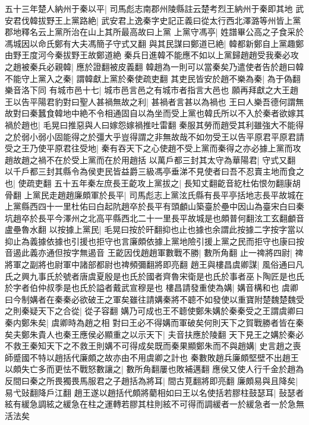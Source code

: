 五十三年楚人納州于秦以平|{
	司馬彪志南郡州陵縣註云楚考烈王納州于秦即其地}
武安君伐韓拔野王上黨路絶|{
	武安君上逸秦字史記正義曰從太行西北澤潞等州皆上黨郡地釋名云上黨所治在山上其所最高故曰上黨}
上黨守馮亭|{
	姓譜畢公高之子食采於馮城因以命氏鄭有大夫馮簡子守式又翻}
與其民謀曰鄭道已絶|{
	韓都新鄭自上黨趣鄭由野王度河今秦拔野王故鄭道絶}
秦兵日進韓不能應不如以上黨歸趙趙受我秦必攻之趙被秦兵必親韓|{
	應於證翻被皮義翻}
韓趙為一則可以當秦矣乃遣使者告於趙曰韓不能守上黨入之秦|{
	謂韓獻上黨於秦使疏吏翻}
其吏民皆安於趙不樂為秦|{
	為于偽翻樂音洛下同}
有城市邑十七|{
	城市邑言邑之有城市者指言大邑也}
願再拜獻之大王趙王以告平陽君豹對曰聖人甚禍無故之利|{
	甚禍者言甚以為禍也}
王曰人樂吾德何謂無故對曰秦蠶食韓地中絶不令相通固自以為坐而受上黨也韓氏所以不入於秦者欲嫁其禍於趙也|{
	毛晃曰推惡與人曰嫁怨嫁禍推吐雷翻}
秦服其勞而趙受其利雖強大不能得之於弱小弱小固能得之於彊大乎豈得謂之非無故哉不如勿受王以告平原君平原君請受之王乃使平原君往受地|{
	秦有吞天下之心使趙不受上黨而秦得之亦必據上黨而攻趙故趙之禍不在於受上黨而在於用趙括}
以萬戶都三封其太守為華陽君|{
	守式又翻}
以千戶都三封其縣令為侯吏民皆益爵三級馮亭垂涕不見使者曰吾不忍賣主地而食之也|{
	使疏吏翻}
五十五年秦左庶長王齕攻上黨拔之|{
	長知丈翻齕音紇杜佑恨勿翻康胡骨翻}
上黨民走趙趙廉頗軍於長平|{
	司馬彪志上黨泫氏縣有長平亭括地志長平故城在上黨縣西四十一里杜佑曰白起阬趙卒於長平有頭顱山築臺於壘中因山為臺宋白曰秦坑趙卒於長平今澤州之北高平縣西北二十一里長平故城是也頗普何翻泫工玄翻顱音盧壘魯水翻}
以按據上黨民|{
	毛晃曰按於旰翻抑也止也據也余謂此按據二字按字當以抑止為義據依據也引援也拒守也言廉頗依據上黨地險引援上黨之民而拒守也康曰按音遏此義亦通但按字無遏音}
王齕因伐趙趙軍數戰不勝|{
	數所角翻}
止一禆將四尉|{
	禆將軍之副將也尉軍中諸部都尉也禆頻彌翻將即亮翻}
趙王與樓昌虞卿謀|{
	風俗通曰凡氏之興九事氏於號者唐虞夏殷是也氏於國者齊魯宋衛是也氏於事者巫卜陶匠是也氏於字者伯仲叔季是也氏於謚者戴武宣穆是也}
樓昌請發重使為媾|{
	媾音構和也}
虞卿曰今制媾者在秦秦必欲破王之軍矣雖往請媾秦將不聼不如發使以重寶附楚魏楚魏受之則秦疑天下之合從|{
	從子容翻}
媾乃可成也王不聼使鄭朱媾於秦秦受之王謂虞卿曰秦内鄭朱矣|{
	虞卿時為趙之相}
對曰王必不得媾而軍破矣何則天下之賀戰勝者皆在秦矣夫鄭朱貴人也秦王應侯必顯重之以示天下|{
	夫音扶應於陵翻}
天下見王之媾於秦必不救王秦知天下之不救王則媾不可得成矣既而秦果顯鄭朱而不與趙媾|{
	史言趙之喪師蹙國不特以趙括代廉頗之故亦由不用虞卿之計也}
秦數敗趙兵廉頗堅壁不出趙王以頗失亡多而更怯不戰怒數讓之|{
	數所角翻屢也敗補邁翻}
應侯又使人行千金於趙為反間曰秦之所畏獨畏馬服君之子趙括為將耳|{
	間古莧翻將即亮翻}
廉頗易與且降矣|{
	易弋䜴翻降戶江翻}
趙王遂以趙括代頗將藺相如曰王以名使括若膠柱鼓瑟耳|{
	鼔瑟者絃有緩急調絃之緩急在柱之運轉若膠其柱則絃不可得而調緩者一於緩急者一於急無活法矣}
